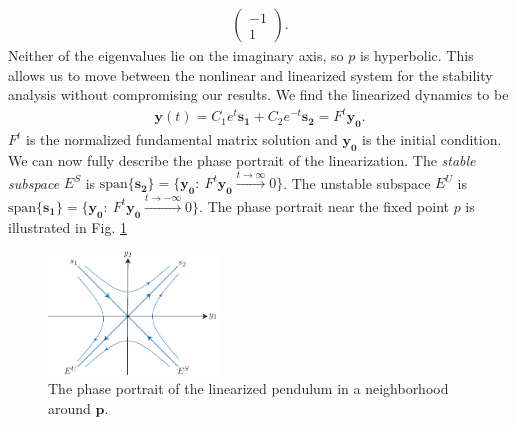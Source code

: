 \begin{ex}
\begin{align}
\begin{pmatrix}
			-1 \\ 1
		\end{pmatrix}.
	\end{align}
	Neither of the eigenvalues lie on the imaginary axis, so $p$ is hyperbolic. This allows us to move between the nonlinear and linearized system for the stability analysis without compromising our results. We find the linearized dynamics to be
	\begin{align}
		\bm{y} (t) = C_1 e^{t} \bm{s_1}  + C_2 e^{-t}\bm{s_2} = F^{t}\bm{y_0} .
	\end{align}
	$F^{t}$ is the normalized fundamental matrix solution and $\bm{y_0} $ is the initial condition. We can now fully describe the phase portrait of the linearization. The \emph{stable subspace} $E^{S}$ is $ \textrm{span} \{\bm{s_2} \} = \{\bm{y_0} :\ F^{t}\bm{y_0} \xrightarrow{t \to \infty} 0 \} $. The unstable subspace $E^{U}$ is $ \textrm{span} \{\bm{s_1}\} = \{\bm{y_0} : \ F^{t}\bm{y_0} \xrightarrow{t \to - \infty }0\} $. The phase portrait near the fixed point $p$ is illustrated in Fig. \ref{fig:pend_phase_p}
\begin{figure}[h!]
	\centering
	\includegraphics[width=0.4\textwidth]{figures/ch2/17pend_phase_p}
	\caption{The phase portrait of the linearized pendulum in a neighborhood around $\bm{p} $.}
	\label{fig:pend_phase_p}
\end{figure}


\end{ex}
